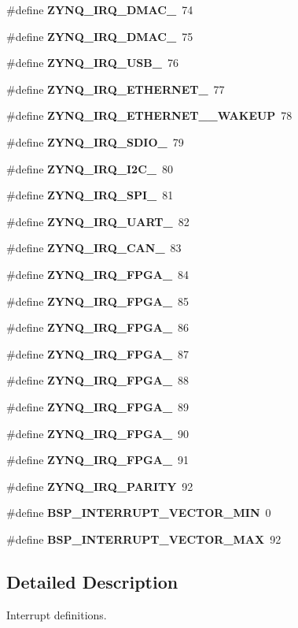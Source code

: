 \begin{DoxyCompactItemize}
\item 
\#define {\bfseries Z\+Y\+N\+Q\+\_\+\+I\+R\+Q\+\_\+\+D\+M\+A\+C\+\_}~74
\item 
\#define {\bfseries Z\+Y\+N\+Q\+\_\+\+I\+R\+Q\+\_\+\+D\+M\+A\+C\+\_}~75
\item 
\#define {\bfseries Z\+Y\+N\+Q\+\_\+\+I\+R\+Q\+\_\+\+U\+S\+B\+\_}~76
\item 
\#define {\bfseries Z\+Y\+N\+Q\+\_\+\+I\+R\+Q\+\_\+\+E\+T\+H\+E\+R\+N\+E\+T\+\_}~77
\item 
\#define {\bfseries Z\+Y\+N\+Q\+\_\+\+I\+R\+Q\+\_\+\+E\+T\+H\+E\+R\+N\+E\+T\+\_\+\_\+\+W\+A\+K\+E\+UP}~78
\item 
\#define {\bfseries Z\+Y\+N\+Q\+\_\+\+I\+R\+Q\+\_\+\+S\+D\+I\+O\+\_}~79
\item 
\#define {\bfseries Z\+Y\+N\+Q\+\_\+\+I\+R\+Q\+\_\+\+I2\+C\+\_}~80
\item 
\#define {\bfseries Z\+Y\+N\+Q\+\_\+\+I\+R\+Q\+\_\+\+S\+P\+I\+\_}~81
\item 
\#define {\bfseries Z\+Y\+N\+Q\+\_\+\+I\+R\+Q\+\_\+\+U\+A\+R\+T\+\_}~82
\item 
\#define {\bfseries Z\+Y\+N\+Q\+\_\+\+I\+R\+Q\+\_\+\+C\+A\+N\+\_}~83
\item 
\#define {\bfseries Z\+Y\+N\+Q\+\_\+\+I\+R\+Q\+\_\+\+F\+P\+G\+A\+\_}~84
\item 
\#define {\bfseries Z\+Y\+N\+Q\+\_\+\+I\+R\+Q\+\_\+\+F\+P\+G\+A\+\_}~85
\item 
\#define {\bfseries Z\+Y\+N\+Q\+\_\+\+I\+R\+Q\+\_\+\+F\+P\+G\+A\+\_}~86
\item 
\#define {\bfseries Z\+Y\+N\+Q\+\_\+\+I\+R\+Q\+\_\+\+F\+P\+G\+A\+\_}~87
\item 
\#define {\bfseries Z\+Y\+N\+Q\+\_\+\+I\+R\+Q\+\_\+\+F\+P\+G\+A\+\_}~88
\item 
\#define {\bfseries Z\+Y\+N\+Q\+\_\+\+I\+R\+Q\+\_\+\+F\+P\+G\+A\+\_}~89
\item 
\#define {\bfseries Z\+Y\+N\+Q\+\_\+\+I\+R\+Q\+\_\+\+F\+P\+G\+A\+\_}~90
\item 
\#define {\bfseries Z\+Y\+N\+Q\+\_\+\+I\+R\+Q\+\_\+\+F\+P\+G\+A\+\_}~91
\item 
\#define {\bfseries Z\+Y\+N\+Q\+\_\+\+I\+R\+Q\+\_\+\+P\+A\+R\+I\+TY}~92
\item 
\#define {\bfseries B\+S\+P\+\_\+\+I\+N\+T\+E\+R\+R\+U\+P\+T\+\_\+\+V\+E\+C\+T\+O\+R\+\_\+\+M\+IN}~0
\item 
\#define {\bfseries B\+S\+P\+\_\+\+I\+N\+T\+E\+R\+R\+U\+P\+T\+\_\+\+V\+E\+C\+T\+O\+R\+\_\+\+M\+AX}~92
\end{DoxyCompactItemize}


\subsection{Detailed Description}
Interrupt definitions. 

